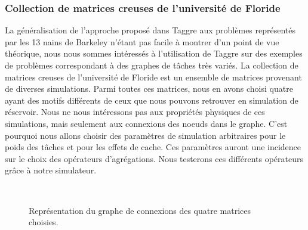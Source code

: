 \subsubsection{Collection de matrices creuses de l'université de Floride}
La généralisation de l'approche proposé dans Taggre aux problèmes représentés par les 13 nains de Barkeley n'étant pas facile à montrer d'un point de vue théorique, nous nous sommes intéressés à l'utilisation de Taggre sur des exemples de problèmes correspondant à des graphes de tâches très variés.
%
La collection de matrices creuses de l'université de Floride est un ensemble de matrices provenant de diverses simulations.
%
Parmi toutes ces matrices, nous en avons choisi quatre ayant des motifs différents de ceux que nous pouvons retrouver en simulation de réservoir.
%
Nous ne nous intéressons pas aux propriétés physiques de ces simulations, mais seulement aux connexions des noeuds dans le graphe.
%
C'est pourquoi nous allons choisir des paramètres de simulation arbitraires pour le poids des tâches et pour les effets de cache.
%
Ces paramètres auront une incidence sur le choix des opérateurs d'agrégations.
%
Nous testerons ces différents opérateurs grâce à notre simulateur.


\begin{figure}[!h]
     \begin{center}
        ~
        ~
    \end{center}
    \caption{Représentation du graphe de connexions des quatre matrices choisies.}
    \label{fig:florida}
\end{figure}

